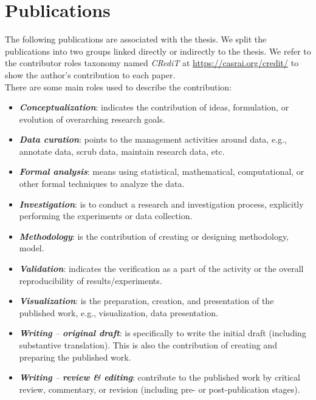 \section{Publications}
\label{sec:intro_publication}

The following publications are associated with the thesis. We split the publications into two groups linked directly or indirectly to the thesis. We refer to the contributor roles taxonomy named \textit{CRediT} at \url{https://casrai.org/credit/} to show the author's contribution to each paper.\\

There are some main roles used to describe the contribution:
\begin{itemize}
	\item \textit{\textbf{Conceptualization}}: indicates the contribution of ideas, formulation, or evolution of overarching research goals.
	\item \textit{\textbf{Data curation}}: points to the management activities around data, e.g., annotate data, scrub data, maintain research data, etc.
	\item \textit{\textbf{Formal analysis}}: means using statistical, mathematical, computational, or other formal techniques to analyze the data.
	\item \textit{\textbf{Investigation}}: is to conduct a research and investigation process, explicitly performing the experiments or data collection.
	\item \textit{\textbf{Methodology}}: is the contribution of creating or designing methodology, model.
	\item \textit{\textbf{Validation}}: indicates the verification as a part of the activity or the overall reproducibility of results/experiments.
	\item \textit{\textbf{Visualization}}: is the preparation, creation, and presentation of the published work, e.g., visualization, data presentation.
	\item \textit{\textbf{Writing} – \textbf{original draft}}: is specifically to write the initial draft (including substantive translation). This is also the contribution of creating and preparing the published work.
	\item \textit{\textbf{Writing} – \textbf{review \& editing}}: contribute to the published work by critical review, commentary, or revision (including pre- or post-publication stages).
\end{itemize}

